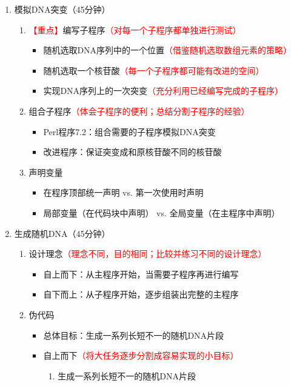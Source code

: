 \documentclass{TIJMUjiaoanLL}
\begin{document}
\begin{enumerate}
  \item 模拟DNA突变（45分钟）
    \begin{enumerate}
      \item \textcolor{red}{【重点】}编写子程序\textcolor{red}{（对每一个子程序都单独进行测试）}
	\begin{itemize}
	  \item 随机选取DNA序列中的一个位置\textcolor{red}{（借鉴随机选取数组元素的策略）}
	  \item 随机选取一个核苷酸\textcolor{red}{（每一个子程序都可能有改进的空间）}
	  \item 实现DNA序列上的一次突变\textcolor{red}{（充分利用已经编写完成的子程序）}
	\end{itemize}
      \item 组合子程序\textcolor{red}{（体会子程序的便利；总结分割子程序的经验）}
	\begin{itemize}
	  \item Perl程序7.2：组合需要的子程序模拟DNA突变
          \item 改进程序：保证突变成和原核苷酸不同的核苷酸
	\end{itemize}
      \item 声明变量
	\begin{itemize}
	  \item 在程序顶部统一声明 vs. 第一次使用时声明
	  \item 局部变量（在代码块中声明） vs. 全局变量（在主程序中声明）
	\end{itemize}
    \end{enumerate}
  \item 生成随机DNA（45分钟）
    \begin{enumerate}
      \item 设计理念\textcolor{red}{（理念不同，目的相同；比较并练习不同的设计理念）}
	\begin{itemize}
	  \item 自上而下：从主程序开始，当需要子程序再进行编写
	  \item 自下而上：从子程序开始，逐步组装出完整的主程序
	\end{itemize}
      \item 伪代码
	\begin{itemize}
	  \item 总体目标：生成一系列长短不一的随机DNA片段
	  \item 自上而下\textcolor{red}{（将大任务逐步分割成容易实现的小目标）}
	    \begin{enumerate}
	      \item 生成一系列长短不一的随机DNA片段

\end{enumerate}
\end{itemize}
\end{enumerate}
\end{enumerate}
\end{document}
